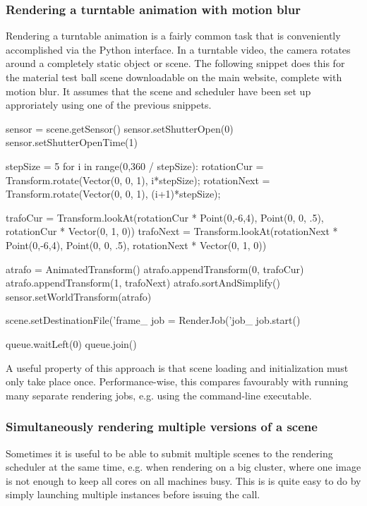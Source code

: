 \subsubsection{Rendering a turntable animation with motion blur}
Rendering a turntable animation is a fairly common task that is
conveniently accomplished via the Python interface. In a turntable
video, the camera rotates around a completely static object or scene.
The following snippet does this for the material test ball scene downloadable
on the main website, complete with motion blur. It assumes that the
scene and scheduler have been set up approriately using one of the previous
snippets.
\begin{python}
sensor = scene.getSensor()
sensor.setShutterOpen(0)
sensor.setShutterOpenTime(1)

stepSize = 5
for i in range(0,360 / stepSize):
    rotationCur  = Transform.rotate(Vector(0, 0, 1), i*stepSize);
    rotationNext = Transform.rotate(Vector(0, 0, 1), (i+1)*stepSize);

    trafoCur  = Transform.lookAt(rotationCur  * Point(0,-6,4),
        Point(0, 0, .5), rotationCur  * Vector(0, 1, 0))
    trafoNext = Transform.lookAt(rotationNext * Point(0,-6,4),
        Point(0, 0, .5), rotationNext * Vector(0, 1, 0))

    atrafo = AnimatedTransform()
    atrafo.appendTransform(0, trafoCur)
    atrafo.appendTransform(1, trafoNext)
    atrafo.sortAndSimplify()
    sensor.setWorldTransform(atrafo)

    scene.setDestinationFile('frame_%
    job = RenderJob('job_%
    job.start()

    queue.waitLeft(0)
    queue.join()
\end{python}
A useful property of this approach is that scene loading and initialization
must only take place once. Performance-wise, this compares favourably with
running many separate rendering jobs, e.g. using the 
command-line executable.

\subsubsection{Simultaneously rendering multiple versions of a scene}
Sometimes it is useful to be able to submit multiple scenes to the rendering scheduler
at the same time, e.g. when rendering on a big cluster, where one image is not enough to keep all
cores on all machines busy. This is is quite easy to do by simply launching multiple 
instances before issuing the  call.

